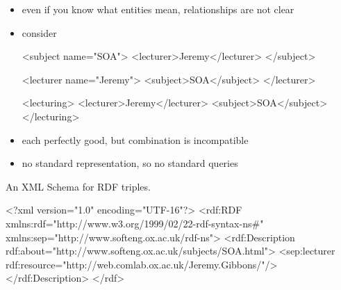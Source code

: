 \documentclass{sepslide-soa-faked} %
\begin{document}
\begin{slide}
\begin{itemize}
\item even if you know what entities mean, relationships are not clear
\item consider
\begin{xml}
<subject name="SOA"> <lecturer>Jeremy</lecturer> </subject>

<lecturer name="Jeremy"> <subject>SOA</subject> </lecturer>

<lecturing>
  <lecturer>Jeremy</lecturer>
  <subject>SOA</subject>
</lecturing>
\end{xml}
\item each perfectly good, but combination is incompatible
\item no standard representation, so no standard queries
\end{itemize}
\end{slide}

\begin{slide}
An XML Schema for RDF triples.
\begin{xml}
<?xml version="1.0" encoding="UTF-16"?>
<rdf:RDF
  xmlns:rdf="http://www.w3.org/1999/02/22-rdf-syntax-ns#" 
  xmlns:sep="http://www.softeng.ox.ac.uk/rdf-ns">
  <rdf:Description 
    rdf:about="http://www.softeng.ox.ac.uk/subjects/SOA.html">
    <sep:lecturer 
      rdf:resource="http://web.comlab.ox.ac.uk/Jeremy.Gibbons/"/>
  </rdf:Description>
</rdf>
\end{xml}
\end{slide}
\end{document}
